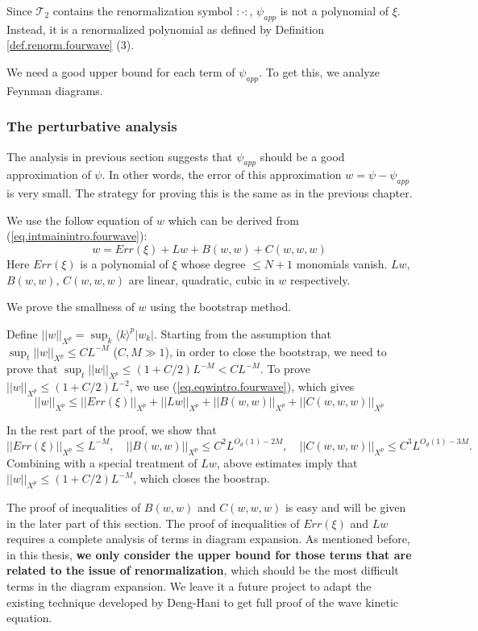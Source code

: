 Since $\mathcal{T}_2$ contains the renormalization symbol $:\cdot:$, $\psi_{app}$ is not a polynomial of $\xi$. Instead, it is a renormalized polynomial as defined by Definition \ref{def.renorm.fourwave} (3).

We need a good upper bound for each term of $\psi_{app}$. To get this, we analyze Feynman diagrams. 

\subsubsection{The perturbative analysis}\label{sec.pert intro.fourwave} The analysis in previous section suggests that $\psi_{app}$ should be a good approximation of $\psi$. In other words, the error of this approximation $w=\psi-\psi_{app}$ is very small. The strategy for proving this is the same as in the previous chapter.

We use the follow equation of $w$ which can be derived from (\ref{eq.intmainintro.fourwave}):
\begin{equation}\label{eq.eqwintro.fourwave}
 w= Err(\xi)+Lw+B(w,w)+C(w,w,w)
\end{equation}
Here $Err(\xi)$ is a polynomial of $\xi$ whose degree $\le N+1$ monomials vanish. $Lw$, $B(w,w)$, $C(w,w,w)$ are linear, quadratic, cubic in $w$ respectively.

We prove the smallness of $w$ using the bootstrap method.

Define $||w||_{X^p}=\sup_{k} \langle k\rangle^{p} |w_k|$. Starting from the assumption that $\sup_t||w||_{X^p}\le CL^{-M}$ ($C,M\gg 1$), in order to close the bootstrap, we need to prove that $\sup_t||w||_{X^p}\le (1+C/2)L^{-M}<CL^{-M}$. To prove $||w||_{X^p}\le (1+C/2)L^{-2}$, we use (\ref{eq.eqwintro.fourwave}), which gives
\begin{equation}\label{eq.ineqw.fourwave}
 ||w||_{X^p}\le ||Err(\xi)||_{X^p}+||Lw||_{X^p}+||B(w,w)||_{X^p}+||C(w,w,w)||_{X^p}
\end{equation}

In the rest part of the proof, we show that 
\begin{equation}
 ||Err(\xi)||_{X^p}\le L^{-M},
 \quad ||B(w,w)||_{X^p}\le C^2L^{O_d(1)-2M},
 \quad||C(w,w,w)||_{X^p}\le C^3L^{O_d(1)-3M}.
\end{equation}
Combining with a special treatment of $Lw$, above estimates imply that $||w||_{X^p}\le (1+C/2)L^{-M}$, which closes the boostrap.

The proof of inequalities of $B(w,w)$ and $C(w,w,w)$ is easy and will be given in the later part of this section. The proof of inequalities of $Err(\xi)$ and $Lw$ requires a complete analysis of terms in diagram expansion. As mentioned before, in this thesis, \textbf{we only consider the upper bound for those terms that are related to the issue of renormalization}, which should be the most difficult terms in the diagram expansion. We leave it a future project to adapt the existing technique developed by Deng-Hani to get full proof of the wave kinetic equation.


